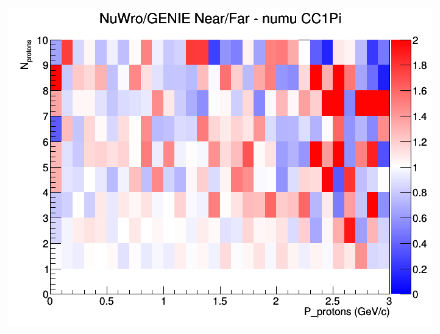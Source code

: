 \documentclass[12pt]{article}
\begin{document}
\begin{figure}[h]
\endminipage
{}
\includegraphics[width=\linewidth]{N_P/nominal/protons/ratios/CC1Pi_NuWro_GENIE_numu_NF_N_P.png}
\endminipage
\newline
\end{figure}
\clearpage
\end{document}
